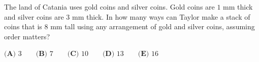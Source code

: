 The land of Catania uses gold coins and silver coins. Gold coins are $1$ mm thick and silver coins are $3$ mm thick. In how many ways can Taylor make a stack of coins that is $8$ mm tall using any arrangement of gold and silver coins, assuming order matters?



$\textbf{(A) } 3\qquad\textbf{(B) } 7\qquad\textbf{(C) } 10\qquad\textbf{(D) } 13\qquad\textbf{(E) } 16$
